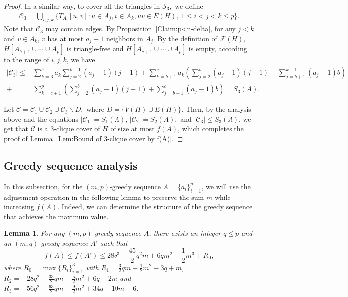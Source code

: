 \documentclass[11pt,a4paper]{article}
\newtheorem{lem}[dfn]{Lemma}
\newcommand{\dC}{{\mathcal{C}}}
\newcommand{\dF}{{\mathcal{F}}}
\newcommand{\dS}{{\mathcal{S}}}
\begin{document}
\begin{proof}
In a similar way, to cover all the triangles in $\dS_3,$ we define
\begin{align*}
\dC_3=\bigcup\limits_{i,j,k} \{T_{A_i}[u,v]: u\in A_j, v\in A_k, uv\in E(H),\ 1\le i< j<k\le p\}.
\end{align*}
Note that $\dC_3$ may contain edges.
By Proposition~\ref{Claim:p<n-delta}, 
for any $j<k$ and $v\in A_k$, $v$ has at most $a_j-1$ neighbors in $A_j.$   
By the definition of $\dF(H),$ $H[A_{b+1}\cup\cdots\cup A_p]$ is triangle-free and $H[A_{c+1}\cup\cdots\cup A_p]$ is empty, according to the range of $i,j,k$, 
we have
\begin{align}\label{Equ:upper bound on C3}
|\dC_3|\leq &\sum_{k=3}^{b} a_k \sum_{j=2}^{k-1} (a_j-1) (j-1)
+\sum_{k=b+1}^{c} a_k
\left( \sum_{j=2}^{b}(a_j-1)(j-1) + \sum_{j=b+1}^{k-1}(a_j-1)b \right)\nonumber \\
+&\sum_{k=c+1}^{p} \left(  \sum_{j=2}^{b}(a_j-1)(j-1) + \sum_{j=b+1}^{c}(a_j-1)b \right)=S_3(A).
\end{align}

Let $\dC=\dC_1\cup \dC_2 \cup \dC_3\backslash D,$ where $D=\{V(H)\cup E(H)\}.$
Then, by the analysis above and the equations 
$|\dC_1|=S_1(A)$, $|\dC_2|=S_2(A),$ and $|\dC_3|\le S_3(A)$, 
we get that $\dC$ is a $3$-clique cover of $H$ of size at most $f(A)$, which completes the proof of Lemma~\ref{Lem:Bound of 3-clique cover by f(A)}. 
\end{proof}


\subsection{Greedy sequence analysis}\label{Sec:Optimize the values of greedy sequences}
In this subsection, for the $(m,p)$-greedy sequence $A=\{a_i\}_{i=1}^p$, we will use the adjustment operation in the following lemma to preserve the sum $m$ while increasing $f(A)$. 
Indeed, we can determine the structure of the greedy sequence that achieves the maximum value.

\begin{lem}\label{Lem:adjustment method}
	For any $(m,p)$-greedy sequence $A$, there exists an integer $q\le p$ and an $(m,q)$-greedy sequence $A'$ such that 
    $$f(A)\le f(A')\le 28q^3-\frac{45}{2}q^2m+6qm^2-\frac{1}{2}m^3+R_0,$$
    where $R_0=\max\{R_i\}_{i=1}^3$ with 
    $R_1=\frac{3}{2}qm-\frac{1}{2}m^2-3q+m$,
    $R_2=-28q^2+\frac{33}{2}qm-\frac{5}{2}m^2+6q-2m$ and 
    $R_3=-56q^2+\frac{63}{2}qm-\frac{9}{2}m^2+34q-10m-6.$ 
\end{lem}
\end{document}
